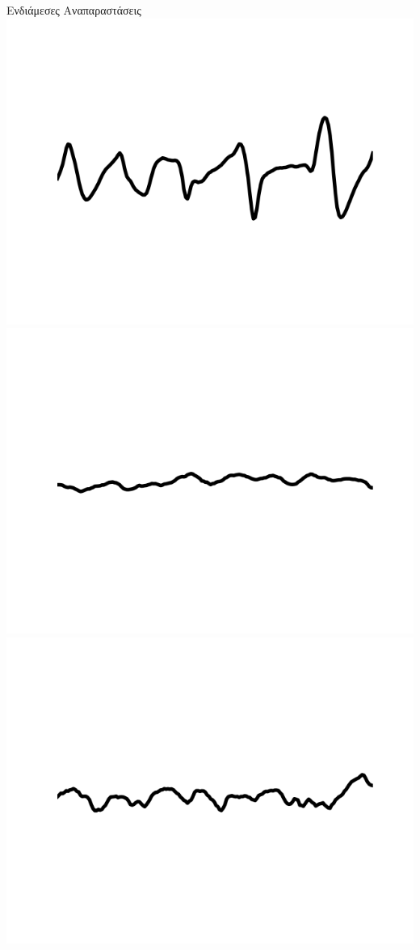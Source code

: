 \documentclass{beamer}
\begin{document}
\begin{frame}[c]{Ενδιάμεσες Αναπαραστάσεις}
	\includegraphics[scale=0.1]{signal_eyes_open.png}
	\includegraphics[scale=0.1]{signal_eyes_closed.png}
	\includegraphics[scale=0.1]{signal_healthy_area.png}

\end{frame}
\end{document}
